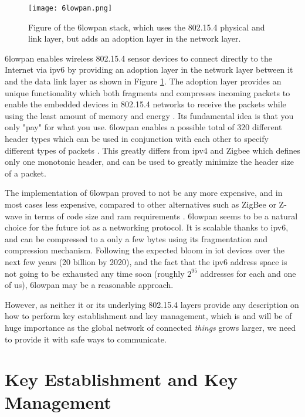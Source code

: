 \begin{figure}[h]
	\centering
	\texttt{[image: 6lowpan.png]}
	\caption{Figure of the \gls{6lowpan} stack, which uses the 802.15.4 physical and link layer, but adds an adoption layer in the network layer.}
	\label{fig:6lowpan-stack}
\end{figure}

\gls{6lowpan} enables wireless 802.15.4 sensor devices to connect directly to the Internet via \gls{ip}v6 by providing an adoption layer in the network layer between it and the data link layer as shown in Figure \ref{fig:6lowpan-stack}. The adoption layer provides an unique functionality which both fragments and compresses incoming packets to enable the embedded devices in 802.15.4 networks to receive the packets while using the least amount of memory and energy \cite{krentz20136lowpan}. Its fundamental idea is that you only "pay" for what you use. \gls{6lowpan} enables a possible total of 320 different header types which can be used in conjunction with each other to specify different types of packets \cite{rfc6282}. This greatly differs from \gls{ip}v4 and Zigbee which defines only one monotonic header, and can be used to greatly minimize the header size of a packet.


The implementation of \gls{6lowpan} proved to not be any more expensive, and in most cases less expensive, compared to other alternatives such as ZigBee or Z-wave in terms of code size and \gls{ram} requirements \cite{Mulligan2007}. \gls{6lowpan} seems to be a natural choice for the future \gls{iot} as a networking protocol. It is scalable thanks to \gls{ip}v6, and can be compressed to a only a few bytes using its fragmentation and compression mechanism. Following the expected bloom in \gls{iot} devices over the next few years (20 billion by 2020), and the fact that the \gls{ip}v6 address space is not going to be exhausted any time soon (roughly $2^{95}$ addresses for each and one of us), \gls{6lowpan} may be a reasonable approach.

However, as neither it or its underlying 802.15.4 layers provide any description on how to perform key establishment and key management, which is and will be of huge importance as the global network of connected \emph{things} grows larger, we need to provide it with safe ways to communicate.


\section{Key Establishment and Key Management}

